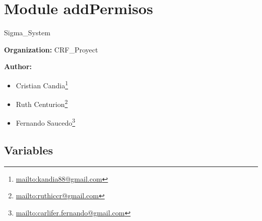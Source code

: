 %
%
%


\section{Module addPermisos}

    \label{addPermisos}
Sigma\_System

\textbf{Organization:} CRF\_Proyect



\textbf{Author:} \begin{itemize}
\setlength{\parskip}{0.6ex}
  \item Cristian 
    Candia\footnote{\href{mailto:kandia88@gmail.com}{mailto:kandia88@gmail.com}}

  \item Ruth 
    Centurion\footnote{\href{mailto:ruthiccr@gmail.com}{mailto:ruthiccr@gmail.com}}

  \item Fernando 
    Saucedo\footnote{\href{mailto:carlifer.fernando@gmail.com}{mailto:carlifer.fernando@gmail.com}}

\end{itemize}





  \subsection{Variables}

